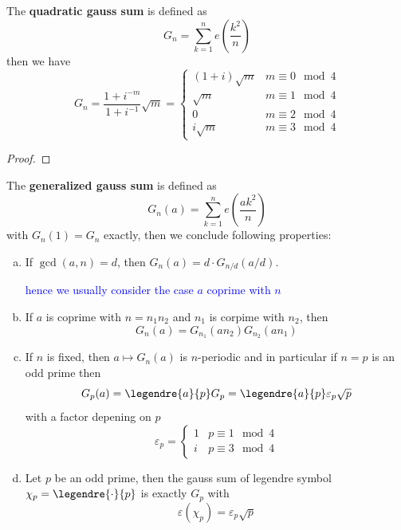 \begin{lemma}
    The \textbf{ quadratic gauss sum} is defined as 
    \[G_n = \sum_{k=1}^n e(\frac{k^2}{n})\]
    then we have
    \[G_n = \frac{1+i^{-m}}{1+i^{-1}}\sqrt{m} = \begin{cases}
        (1+i)\sqrt{m} & m \equiv 0 \mod 4 \\
        \sqrt{m} & m \equiv 1 \mod 4 \\
        0 & m \equiv 2 \mod 4 \\
        i\sqrt{m} & m \equiv 3 \mod 4
    \end{cases}\]
\end{lemma}

\begin{proof}
    
\end{proof}

\begin{lemma}
    The \textbf{generalized gauss sum} is defined as 
    \[G_n(a) = \sum_{k=1}^n e(\frac{ak^2}{n})\]
    with \(G_n(1) = G_n\) exactly, then we conclude following properties:
    \begin{enumerate}[(a)]
        \item If \(\gcd(a,n) = d\), then \(G_n(a) = d \cdot G_{n/d}(a/d)\).
        \begin{center}
            \textcolor{blue}{hence we usually consider the case \(a\) coprime with \(n\)}
        \end{center}

        \item If \(a\) is coprime with \(n = n_1n_2\) and \(n_1\) is corpime with \(n_2\), then 
        \[G_n(a) = G_{n_1}(an_2) G_{n_2}(an_1)\] 

        \item If \(n\) is fixed, then \(a \mapsto G_n(a)\) is \(n\)-periodic and in particular if \(n = p\) is an odd prime then
        \[G_p(a) = \legendre{a}{p} G_p = \legendre{a}{p} \varepsilon_p \sqrt{p}\]
        with a factor depening on \(p\)
        \[\varepsilon_p = \begin{cases}
            1 & p \equiv 1 \mod 4 \\
            i & p \equiv 3 \mod 4
        \end{cases}\]

        \item Let \(p\) be an odd prime, then the gauss sum of legendre symbol \(\chi_p = \legendre{\cdot}{p}\) is exactly \(G_p\) with
        \[\varepsilon(\chi_p) = \varepsilon_p \sqrt{p}\]
    \end{enumerate}
\end{lemma}

